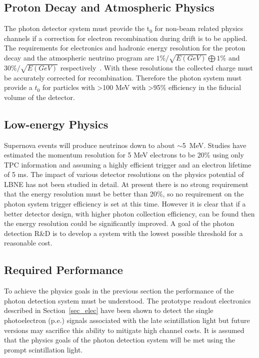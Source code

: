 \subsection{Proton Decay and Atmospheric Physics}

The photon detector system must provide the t$_0$ for non-beam related
physics channels if a correction for electron recombination during
drift is to be applied. The requirements for electronics and hadronic
energy resolution for the proton decay and the atmospheric neutrino
program are $1\% / \sqrt{E(GeV)} \bigoplus 1\%$ and $30\% /
\sqrt{E(GeV)}$ respectively~\cite{bib:sci-opp-doc}. With these
resolutions the collected charge must be accurately corrected for
recombination. Therefore the photon system must provide a $t_{0}$ for
particles with >100 MeV with >95\% efficiency in the fiducial volume
of the detector.

\subsection{Low-energy Physics}

Supernova events will produce neutrinos down to about
$\sim$5~MeV. Studies have estimated the momentum resolution for 5 MeV
electrons to be 20\% using only TPC information and assuming a highly
efficient trigger and an electron lifetime of 5 ms. The impact of
various detector resolutions on the physics potential of LBNE has not
been studied in detail. At present there is no strong requirement that
the energy resolution must be better than 20\%, so no requirement on
the photon system trigger efficiency is set at this time. However it
is clear that if a better detector design, with higher photon
collection efficiency, can be found then the energy resolution could
be significantly improved. A goal of the photon detection R\&D is to
develop a system with the lowest possible threshold for a reasonable
cost.

\subsection{Required Performance}

To achieve the physics goals in the previous section the performance
of the photon detection system must be understood. The prototype
readout electronics described in Section~\ref{sec_elec} have been
shown to detect the single photoelectron (p.e.) signals associated
with the late scintillation light but future versions may sacrifice
this ability to mitigate high channel costs. It is assumed that the
physics goals of the photon detection system will be met using the
prompt scintillation light.

